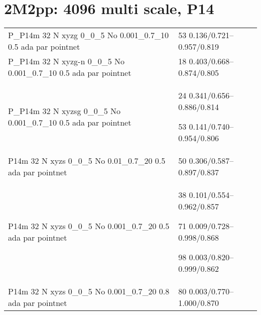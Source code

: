 \documentclass[,table,dvipsnames]{article}
\begin{document}
\section{2M2pp: 4096 multi scale, P14}
\noindent\begin{tabular}{|p{10cm}|p{5.5cm}| }	
\hline
\rowcolor{green!20}
P\_P14m 32 N xyzg 0\_0\_5 No 0.001\_0.7\_10 0.5 ada par pointnet& 53 0.136/0.721--0.957/0.819\\
\rowcolor{red!20}
P\_P14m 32 N xyzg-n 0\_0\_5 No 0.001\_0.7\_10 0.5 ada par pointnet& 18 0.403/0.668--0.874/0.805\\
\rowcolor{green!20}
 P\_P14m 32 N xyzsg 0\_0\_5 No 0.001\_0.7\_10 0.5 ada par pointnet& 24 0.341/0.656--0.886/0.814\par  53 0.141/0.740--0.954/0.806\\
 \rowcolor{red!20}
 P14m 32 N xyzs 0\_0\_5 No 0.01\_0.7\_20 0.5 ada par pointnet& 50 0.306/0.587--0.897/0.837\\
 \rowcolor{green!20}
 P14m 32 N xyzs 0\_0\_5 No 0.001\_0.7\_20 0.5 ada par pointnet&38 0.101/0.554--0.962/0.857 \par 71 0.009/0.728--0.998/0.868\par 98 0.003/0.820--0.999/0.862\\
 \rowcolor{red!20}
 P14m 32 N xyzs 0\_0\_5 No 0.001\_0.7\_20 0.8 ada par pointnet& 80 0.003/0.770--1.000/0.870 \\
\hline 	
\end{tabular}
\end{document}
